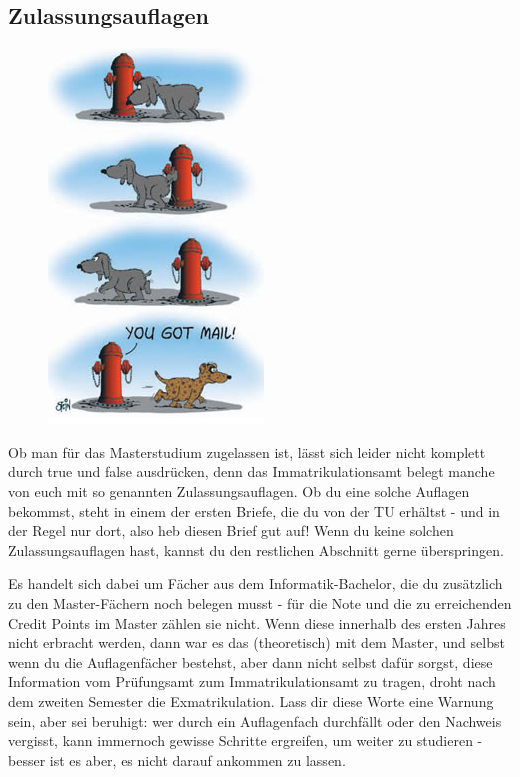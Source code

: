 \begin{multicols}{2}
\label{auflagen}
\subsection{Zulassungsauflagen}
\ifpdf
\begin{figure}
  \includegraphics[width=0.75\linewidth]
  {bilder/comics/stein2.png}
\end{figure}
\fi
\hspace{0.25cm}
Ob man für das Masterstudium zugelassen ist, lässt sich leider nicht komplett durch true und false ausdrücken, denn das Immatrikulationsamt belegt manche von euch mit so genannten Zulassungsauflagen. Ob du eine solche Auflagen bekommst, steht in einem der ersten Briefe, die du von der TU erhältst - und in der Regel nur dort, also heb diesen Brief gut auf! Wenn du keine solchen Zulassungsauflagen hast, kannst du den restlichen Abschnitt gerne überspringen.

Es handelt sich dabei um Fächer aus dem Informatik-Bachelor, die du zusätzlich zu den Master-Fächern noch belegen musst - für die Note und die zu erreichenden Credit Points im Master zählen sie nicht. Wenn diese innerhalb des ersten Jahres nicht erbracht werden, dann war es das (theoretisch) mit dem Master, und selbst wenn du die Auflagenfächer bestehst, aber dann nicht selbst dafür sorgst, diese Information vom Prüfungsamt zum Immatrikulationsamt zu tragen, droht nach dem zweiten Semester die Exmatrikulation. Lass dir diese Worte eine Warnung sein, aber sei beruhigt: wer durch ein Auflagenfach durchfällt oder den Nachweis vergisst, kann immernoch gewisse Schritte ergreifen, um weiter zu studieren - besser ist es aber, es nicht darauf ankommen zu lassen.


\end{multicols}
